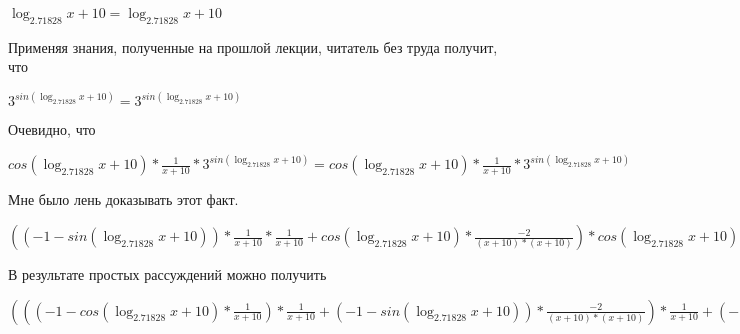 \documentclass[12pt,a4paper,fleqn]{article}
\theoremstyle{definition}
\begin{document}
$\log_{ 2.71828 }{ x  +  10 } = \log_{ 2.71828 }{ x  +  10 }$

Применяя знания, полученные на прошлой лекции, читатель без труда получит, что 

${ 3 }^{sin(\log_{ 2.71828 }{ x  +  10 })} = { 3 }^{sin(\log_{ 2.71828 }{ x  +  10 })}$

Очевидно, что 

$cos(\log_{ 2.71828 }{ x  +  10 }) * \frac{ 1 }{ x  +  10 }
 * { 3 }^{sin(\log_{ 2.71828 }{ x  +  10 })} = cos(\log_{ 2.71828 }{ x  +  10 }) * \frac{ 1 }{ x  +  10 }
 * { 3 }^{sin(\log_{ 2.71828 }{ x  +  10 })}$

Мне было лень доказывать этот факт.

$(( -1  - sin(\log_{ 2.71828 }{ x  +  10 })) * \frac{ 1 }{ x  +  10 }
 * \frac{ 1 }{ x  +  10 }
 + cos(\log_{ 2.71828 }{ x  +  10 }) * \frac{ -2 }{( x  +  10 ) * ( x  +  10 )}
) * cos(\log_{ 2.71828 }{ x  +  10 }) * \frac{ 1 }{ x  +  10 }
 * { 3 }^{sin(\log_{ 2.71828 }{ x  +  10 })} = (( -1  - sin(\log_{ 2.71828 }{ x  +  10 })) * \frac{ 1 }{ x  +  10 }
 * \frac{ 1 }{ x  +  10 }
 + cos(\log_{ 2.71828 }{ x  +  10 }) * \frac{ -2 }{( x  +  10 ) * ( x  +  10 )}
) * cos(\log_{ 2.71828 }{ x  +  10 }) * \frac{ 1 }{ x  +  10 }
 * { 3 }^{sin(\log_{ 2.71828 }{ x  +  10 })}$

В результате простых рассуждений можно получить 

$((( -1  - cos(\log_{ 2.71828 }{ x  +  10 }) * \frac{ 1 }{ x  +  10 }
) * \frac{ 1 }{ x  +  10 }
 + ( -1  - sin(\log_{ 2.71828 }{ x  +  10 })) * \frac{ -2 }{( x  +  10 ) * ( x  +  10 )}
) * \frac{ 1 }{ x  +  10 }
 + ( -1  - sin(\log_{ 2.71828 }{ x  +  10 })) * \frac{ 1 }{ x  +  10 }
 * \frac{ -2 }{( x  +  10 ) * ( x  +  10 )}
 + ( -1  - sin(\log_{ 2.71828 }{ x  +  10 })) * \frac{ 1 }{ x  +  10 }
 * \frac{ -2 }{( x  +  10 ) * ( x  +  10 )}
 + cos(\log_{ 2.71828 }{ x  +  10 }) * \frac{ -1  -  -2  * ( x  +  10  +  x  +  10 )}{( x  +  10 ) * ( x  +  10 ) * ( x  +  10 ) * ( x  +  10 )}
) * { 3 }^{sin(\log_{ 2.71828 }{ x  +  10 })} + (( -1  - sin(\log_{ 2.71828 }{ x  +  10 })) * \frac{ 1 }{ x  +  10 }
 * \frac{ 1 }{ x  +  10 }
 + cos(\log_{ 2.71828 }{ x  +  10 }) * \frac{ -2 }{( x  +  10 ) * ( x  +  10 )}
) * cos(\log_{ 2.71828 }{ x  +  10 }) * \frac{ 1 }{ x  +  10 }
 * { 3 }^{sin(\log_{ 2.71828 }{ x  +  10 })} = ((( -1  - cos(\log_{ 2.71828 }{ x  +  10 }) * \frac{ 1 }{ x  +  10 }
) * \frac{ 1 }{ x  +  10 }
 + ( -1  - sin(\log_{ 2.71828 }{ x  +  10 })) * \frac{ -2 }{( x  +  10 ) * ( x  +  10 )}
) * \frac{ 1 }{ x  +  10 }
 + ( -1  - sin(\log_{ 2.71828 }{ x  +  10 })) * \frac{ 1 }{ x  +  10 }
 * \frac{ -2 }{( x  +  10 ) * ( x  +  10 )}
 + ( -1  - sin(\log_{ 2.71828 }{ x  +  10 })) * \frac{ 1 }{ x  +  10 }
 * \frac{ -2 }{( x  +  10 ) * ( x  +  10 )}
 + cos(\log_{ 2.71828 }{ x  +  10 }) * \frac{ -1  -  -2  * ( x  +  10  +  x  +  10 )}{( x  +  10 ) * ( x  +  10 ) * ( x  +  10 ) * ( x  +  10 )}
) * { 3 }^{sin(\log_{ 2.71828 }{ x  +  10 })} + (( -1  - sin(\log_{ 2.71828 }{ x  +  10 })) * \frac{ 1 }{ x  +  10 }
 * \frac{ 1 }{ x  +  10 }
 + cos(\log_{ 2.71828 }{ x  +  10 }) * \frac{ -2 }{( x  +  10 ) * ( x  +  10 )}
) * cos(\log_{ 2.71828 }{ x  +  10 }) * \frac{ 1 }{ x  +  10 }
 * { 3 }^{sin(\log_{ 2.71828 }{ x  +  10 })}$
\end{document}
